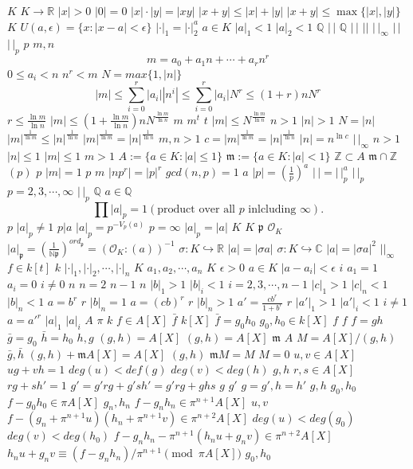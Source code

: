 \documentclass{article}
\begin{document}
$K$
$K \rightarrow \mathbb{R}$
$|x|>0$
$|0|=0$
$|x| \cdot |y| = |xy|$
$|x+y| \leq |x|+|y|$
$|x+y| \leq \max\{|x|,|y|\}$
$K$
$U(a,\epsilon)=\{x:|x-a|<\epsilon\}$
$|\cdot|_1=|\cdot|_2^a$
$a \in K$
$|a|_1<1$
$|a|_2<1$
$\mathbb{Q}$
$|\,|$
$\mathbb{Q}$
$|\,|$
$||$
$|\,|_{\infty}$
$|\,|$
$|\,|_p$
$p$
$m,n$
$$m=a_0+a_1n+\cdots+a_rn^r$$
$0 \leq a_i<n$
$n^r<m$
$N=max\{1,|n|\}$
$$|m|\leq \sum_{i=0}^{r} |a_i||n^i| \leq \sum_{i=0}^{r}|a_i|N^r \leq (1+r)nN^r$$
$r\leq\frac{\ln m}{\ln n}$
$|m| \leq (1+\frac{\ln m}{\ln n})nN^{\frac{\ln m}{\ln n}}$
$m$
$m^t$
$t$
$|m|\leq N^{\frac{\ln m}{\ln n}}$
$n>1$
$|n|>1$
$N=|n|$
$|m|^{\frac{1}{\ln m}} \leq |n|^{\frac{1}{\ln n}}$
$|m|^{\frac{1}{\ln m}} = |n|^{\frac{1}{\ln n}}$
$m,n>1$
$c=|m|^{\frac{1}{\ln m}} = |n|^{\frac{1}{\ln n}}$
$|n|=n^{\ln c}$
$|\,|_{\infty}$
$n>1$
$|n|\leq1$
$|m|\leq1$
$m>1$
$A:=\{a \in K:|a|\leq1\}$
$\mathfrak{m}:=\{a \in K:|a|<1\}$
$\mathbb{Z}\subset A$
$\mathfrak{m} \cap \mathbb{Z}$
$(p)$
$p$
$|m|=1$
$p$
$m$
$|np^r|=|p|^r$
$gcd(n,p)=1$
$a$
$|p|=(\frac{1}{p})^a$
$|\,|=|\,|_p^a$
$|\,|_p$
$p=2,3,\cdots ,\infty$
$|\,|_p$
$\mathbb{Q}$
$a \in \mathbb{Q}$
$$\prod |a|_p = 1 (\text{product over all } p \text{ inlcluding } \infty). $$
$p$
$|a|_p \neq 1$
$p|a$
$|a|_p=p^{-V_p(a)}$
$p=\infty$
$|a|_p=|a|$
$K$
$K$
$\mathfrak{p}$
$\mathcal{O}_K$
$|a|_{\mathfrak{p}}=(\frac{1}{\mathbb{N}\mathfrak{p}})^{ord_{\mathfrak{p}}}=(\mathcal{O}_K:(a))^{-1}$
$\sigma:K \hookrightarrow \mathbb{R}$
$|a|=|\sigma a|$
$\sigma:K \hookrightarrow \mathbb{C}$
$|a|=|\sigma a|^2$
$||_\infty$
$f \in k[t]$
$k$
$|\cdot|_1,|\cdot|_2, \cdots, |\cdot|_n$
$K$
$a_1,a_2,\cdots,a_n$
$K$
$\epsilon>0$
$a \in K$
$|a-a_i|<\epsilon$
$i$
$a_1=1$
$a_i=0$
$i \neq 0$
$n$
$n=2$
$n-1$
$n$
$|b|_1>1$
$|b|_i<1$
$i=2,3,\cdots,n-1$
$|c|_1>1$
$|c|_n<1$
$|b|_n<1$
$a=b^r$
$r$
$|b|_n=1$
$a=(cb)^r$
$r$
$|b|_n>1$
$a'=\frac{cb^r}{1+b^r}$
$r$
$|a'|_1>1$
$|a'|_i<1$
$i \neq 1$
$a=a'^r$
$|a|_1$
$|a|_i$
$A$
$\pi$
$k$
$f \in A[X]$
$\bar{f}$
$k[X]$
$\bar{f}=g_0h_0$
$g_0,h_0 \in k[X]$
$f$
$f$
$f=gh$
$\bar{g}=g_0$
$\bar{h}=h_0$
$h,g$
$(g,h)=A[X]$
$(g,h)=A[X]$
$\mathfrak{m}$
$A$
$M=A[X]/(g,h)$
$\bar{g},\bar{h}$
$(g,h)+\mathfrak{m}A[X]=A[X]$
$(g,h)$
$\mathfrak{m}M=M$
$M=0$
$u,v\in A[X]$
$ug+vh=1$
$deg(u)<def(g)$
$deg(v)<deg(h)$
$g,h$
$r,s \in A[X]$
$rg+sh'=1$
$g'=g'rg+g'sh'=g'rg+ghs$
$g$
$g'$
$g=g', h=h'$
$g,h$
$g_0,h_0$
$f-g_0h_0 \in \pi A[X]$
$g_n,h_n$
$f-g_nh_n \in \pi^{n+1} A[X]$
$u,v$
$f-(g_n+\pi^{n+1}u)(h_n+\pi^{n+1}v) \in \pi^{n+2} A[X]$
$deg(u)<deg(g_0)$
$deg(v)<deg(h_0)$
$f-g_nh_n-\pi^{n+1}(h_nu+g_nv) \in \pi^{n+2}A[X]$
$h_nu+g_nv \equiv (f-g_nh_n)/\pi^{n+1} \pmod{\pi A[X]}$
$g_0,h_0$
\end{document}
